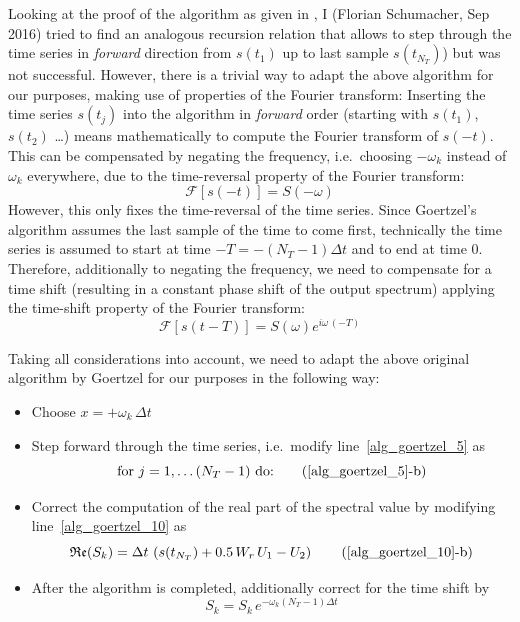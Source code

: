 \documentclass[12pt,a4paper]{article}
\begin{document}
Looking at the proof of the algorithm as given in \cite{Goertzel58}, I (Florian Schumacher, Sep 2016) tried to 
find an analogous recursion relation that allows to step through the time series in \emph{forward} direction
from $s(t_1)$ up to last sample $s(t_{N_T})$) but was not successful. However, there is a trivial way to adapt the
above algorithm for our purposes, making use of properties of the Fourier transform: Inserting the time
series $s(t_j)$ into the algorithm in \emph{forward} order (starting with $s(t_1)$, $s(t_2)$ \dots) means 
mathematically to compute the Fourier transform of $s(-t)$. This can be compensated by negating the frequency,
i.e.\ choosing $-\omega_k$ instead of $\omega_k$ everywhere, due to the time-reversal property of the Fourier transform:
\[
\mathcal{F}[s(-t)] = S(-\omega)
\]
However, this only fixes the time-reversal of the time series. Since Goertzel's algorithm assumes the last sample 
of the time to come first, technically the time series is assumed to start at time $-T = -(N_T-1)\Delta t$ and
to end at time $0$. Therefore, additionally to negating the frequency, we need to compensate for a time shift
(resulting in a constant phase shift of the output spectrum) applying the time-shift property of the Fourier transform:
\[
\mathcal{F}[s(t-T)] = S(\omega)e^{i\omega\,(-T)}
\]

Taking all considerations into account, we need to adapt the above original algorithm by Goertzel for our 
purposes in the following way:
\begin{itemize}
\item Choose $x = +\omega_k\,\Delta t$
\item Step forward through the time series, i.e.\ modify line~\eqref{alg_goertzel_5} as
  \hypersetup{draft=true}
  \begin{equation}
    \text{for $j=1,\dots (N_T-1)$ do:} \tag{\ref*{alg_goertzel_5}-b} %
  \end{equation}
  \hypersetup{draft=false}
\item Correct the computation of the real part of the spectral value by modifying line~\eqref{alg_goertzel_10} as
  \hypersetup{draft=true}
  \begin{equation}
    \mathfrak{Re}(S_k) = \Delta t\,\left(s(t_{N_T}) + 0.5\,W_r \, U_1 - U_2\right) \tag{\ref*{alg_goertzel_10}-b} %
  \end{equation}
  \hypersetup{draft=false}
\item After the algorithm is completed, additionally correct for the time shift by
  \begin{equation}
    S_k = S_k \,e^{-\omega_k(N_T-1)\Delta t}
  \end{equation}
\end{itemize}
\end{document}
